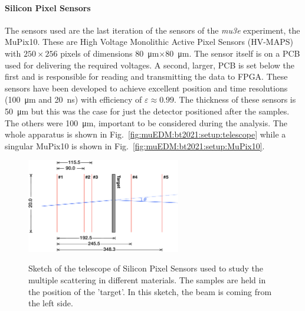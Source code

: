 \begin{refsection}
        \paragraph{Silicon Pixel Sensors}
        The sensors used are the last iteration of the sensors of the \textit{mu3e} experiment, the MuPix10. 
        These are High Voltage Monolithic Active Pixel Sensors (HV-MAPS) with $250\times256$ pixels of dimensions \SI{80}{\micro m}$\times$\SI{80}{\micro m}. 
        The sensor itself is on a PCB used for delivering the required voltages.
        A second, larger, PCB is set below the first and is responsible for reading and transmitting the data to FPGA.
        These sensors have been developed to achieve excellent position and time resolutions (\SI{100}{\micro m} and \SI{20}{ns}) with efficiency of $\varepsilon \approx 0.99$. 
        The thickness of these sensors is \SI{50}{\micro m} but this was the case for just the detector positioned after the samples. 
        The others were \SI{100}{\micro m}, important to be considered during the analysis.
        The whole apparatus is shown in Fig.~\ref{fig:muEDM:bt2021:setup:telescope} while a singular MuPix10 is shown in Fig.~\ref{fig:muEDM:bt2021:setup:MuPix10}.
        
        \begin{figure}
            \centering
            \includegraphics[width=0.6\textwidth]{Figures/muEDM_Dec2021/Positions_Telescope.png}\\
            \caption{Sketch of the telescope of Silicon Pixel Sensors used to study the multiple scattering in different materials.
            The samples are held in the position of the 'target'. 
            In this sketch, the beam is coming from the left side.}
            \label{fig:muEDM:bt2021:telescope}
        \end{figure}


\end{refsection}
